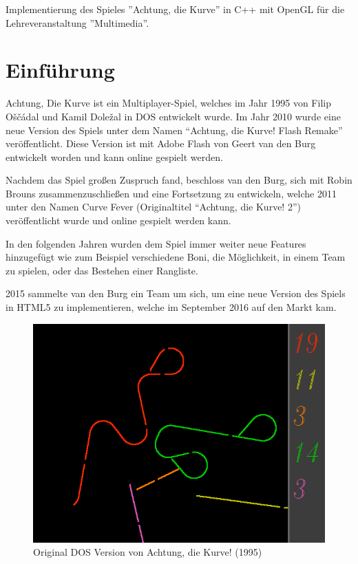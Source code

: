 \documentclass[doktyp=studarbeit]{TUBAFarbeiten}
\begin{document}
\maketitle

\TUBAFErklaerungsseite

Implementierung des Spieles ''Achtung, die Kurve'' in C++ mit OpenGL für die 
Lehreveranstaltung ''Multimedia''.




\tableofcontents
\listoffigures
\listoftables

\newpage

\section{Einführung}

Achtung, Die Kurve ist ein Multiplayer-Spiel, welches im Jahr 1995 von 
Filip Oščádal und Kamil Doležal in DOS entwickelt wurde. Im Jahr 2010 wurde 
eine neue Version des Spiels unter dem Namen “Achtung, die Kurve! Flash Remake”
veröffentlicht. Diese Version ist mit Adobe Flash von Geert van den Burg 
entwickelt worden und kann online gespielt werden.

Nachdem das Spiel großen Zuspruch fand, beschloss van den Burg, sich mit 
Robin Brouns zusammenzuschließen und eine Fortsetzung zu entwickeln, welche 
2011 unter den Namen Curve Fever (Originaltitel “Achtung, die Kurve! 2”) 
veröffentlicht wurde und online gespielt werden kann.

In den folgenden Jahren wurden dem Spiel immer weiter neue Features 
hinzugefügt wie zum Beispiel verschiedene Boni, die Möglichkeit, in einem Team 
zu spielen, oder das Bestehen einer Rangliste.

2015 sammelte van den Burg ein Team um sich, um eine neue Version des Spiels in 
HTML5 zu implementieren, welche im September 2016 auf den Markt kam.

\begin{figure}[!h]
	\centering
	\includegraphics[width=0.5\linewidth]{dos-version.png}
	\caption{Original DOS Version von Achtung, die Kurve! (1995)}
	\label{fig:dos-version}
\end{figure}
\end{document}
